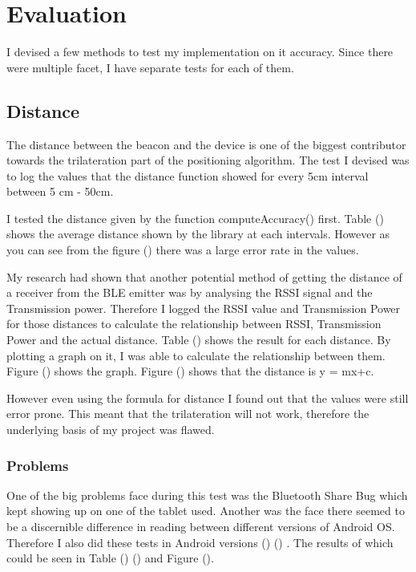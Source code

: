 \section{Evaluation}
I devised a few methods to test my implementation on it accuracy. Since there were multiple facet, I have separate tests for each of them.
\subsection{Distance}
The distance between the beacon and the device is one of the biggest contributor towards the trilateration part of the positioning algorithm. The test I devised was to log the values that the distance function showed for every 5cm interval between 5 cm - 50cm.

I tested the distance given by the function computeAccuracy() first. Table () shows the average distance shown by the library at each intervals. However as you can see from the figure () there was a large error rate in the values. 

My research had shown that another potential method of getting the distance of a receiver from the BLE emitter was by analysing the RSSI signal and the Transmission power. Therefore I logged the RSSI value and Transmission Power for those distances to calculate the relationship between RSSI, Transmission Power and the actual distance. Table () shows the result for each distance. By plotting a graph on it, I was able to calculate the relationship between them. Figure () shows the graph. Figure () shows that the distance is y = mx+c.

However even using the formula for distance I found out that the values were still error prone. This meant that the trilateration will not work, therefore the underlying basis of my project was flawed.
\subsubsection{Problems}
One of the big problems face during this test was the Bluetooth Share Bug\cite{bluetooth-share} which kept showing up on one of the tablet used. Another was the face there seemed to be a discernible difference in reading between different versions of Android OS. Therefore I also did these tests in Android versions () () . The results of which could be seen in Table () () and Figure ().


